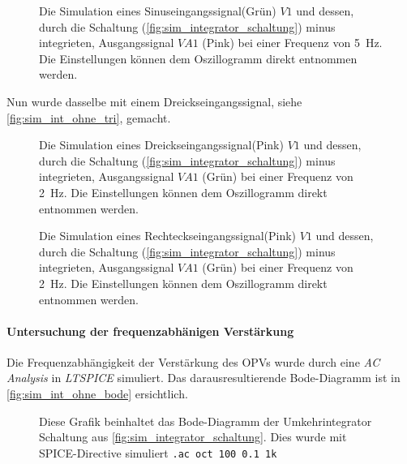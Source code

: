 \documentclass[12pt,english,ngerman]{scrartcl}
\begin{document}
\begin{figure}[H]
  \centering
    \caption{Die Simulation eines Sinuseingangssignal(Grün) $V1$ und dessen, durch
    die Schaltung (\autoref{fig:sim_integrator_schaltung}) minus integrieten,
  Ausgangssignal $VA1$ (Pink) bei einer Frequenz von \SI{5}{\hertz}. Die
Einstellungen können dem Oszillogramm direkt entnommen werden.}
  \label{fig:sim_int_ohne_sin}
\end{figure}

Nun wurde dasselbe mit einem Dreickseingangssignal, siehe
\autoref{fig:sim_int_ohne_tri}, gemacht.

\begin{figure}[H]
  \centering
  \caption{Die Simulation eines Dreickseingangssignal(Pink) $V1$ und dessen, durch
  die Schaltung (\autoref{fig:sim_integrator_schaltung}) minus integrieten,
Ausgangssignal $VA1$ (Grün) bei einer Frequenz von \SI{2}{\hertz}. Die Einstellungen
können dem Oszillogramm direkt entnommen werden.}
  \label{fig:sim_int_ohne_tri}
\end{figure}

\begin{figure}[H]
  \centering
  \caption{Die Simulation eines Rechteckseingangssignal(Pink) $V1$ und dessen, durch
  die Schaltung (\autoref{fig:sim_integrator_schaltung}) minus integrieten,
Ausgangssignal $VA1$ (Grün) bei einer Frequenz von \SI{2}{\hertz}. Die Einstellungen
können dem Oszillogramm direkt entnommen werden.}
  \label{fig:sim_int_ohne_rect}
\end{figure}

\paragraph{Untersuchung der frequenzabhänigen Verstärkung}
Die Frequenzabhängigkeit der Verstärkung des OPVs wurde durch eine \textit{AC
Analysis} in \textit{LTSPICE} simuliert. Das darausresultierende Bode-Diagramm
ist in \autoref{fig:sim_int_ohne_bode} ersichtlich.

\begin{figure}[H]
  \centering
    \caption{Diese Grafik beinhaltet das Bode-Diagramm der Umkehrintegrator
    Schaltung aus \autoref{fig:sim_integrator_schaltung}. Dies wurde mit
  SPICE-Directive simuliert \texttt{.ac oct 100 0.1 1k}}
  \label{fig:sim_int_ohne_bode}
\end{figure}
\end{document}
